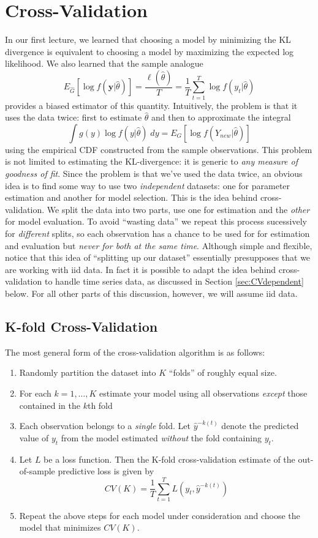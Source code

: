 \chapter{Cross-Validation}
In our first lecture, we learned that choosing a model by minimizing the KL divergence is equivalent to choosing a model by maximizing the expected log likelihood. 
We also learned that the sample analogue
 $$E_{\widehat{G}}\left[\log f(\textbf{y}|\widehat{\theta}) \right]= \frac{\ell(\widehat{\theta})}{T}= \frac{1}{T} \sum_{t=1}^T \log f(y_t|\widehat{\theta})$$
provides a biased estimator of this quantity. Intuitively, the problem is that it uses the data twice: first to estimate $\widehat{\theta}$ and then to approximate the integral
	$$\int g(y) \log f(y|\widehat{\theta}) \; dy = E_G\left[\log f(Y_{new}|\widehat{\theta}) \right]$$
using the empirical CDF constructed from the sample observations.
This problem is not limited to estimating the KL-divergence: it is generic to \emph{any measure of goodness of fit}.
Since the problem is that we've used the data twice, an obvious idea is to find some way to use two \emph{independent} datasets: one for parameter estimation and another for model selection.
This is the idea behind cross-validation.
We split the data into two parts, use one for estimation and the \emph{other} for model evaluation.
To avoid ``wasting data'' we repeat this process sucessively for \emph{different} splits, so each observation has a chance to be used for for estimation and evaluation but \emph{never for both at the same time}.
Although simple and flexible, notice that this idea of ``splitting up our dataset'' essentially presupposes that we are working with iid data.
In fact it is possible to adapt the idea behind cross-validation to handle time series data, as discussed in Section \ref{sec:CVdependent} below.
For all other parts of this discussion, however, we will assume iid data.

\section{K-fold Cross-Validation}
The most general form of the cross-validation algorithm is as follows:
	\begin{enumerate}
		\item Randomly partition the dataset into $K$ ``folds'' of roughly equal size.
		\item For each $k = 1, \hdots, K$ estimate your model using all observations \emph{except} those contained in the $k$th fold
    \item Each observation belongs to a \emph{single} fold.
      Let $\widehat{y}^{-k(t)}$ denote the predicted value of $y_t$ from the model estimated \emph{without} the fold containing $y_t$. 
		\item Let $L$ be a loss function.
      Then the K-fold cross-validation estimate of the out-of-sample predictive loss is given by
			$$CV(K) = \frac{1}{T}\sum_{t=1}^T L\left(y_t, \widehat{y}^{-k(t)}\right)$$
		\item Repeat the above steps for each model under consideration and choose the model that minimizes $CV(K)$.
	\end{enumerate}

